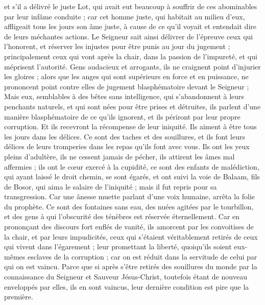\begin{multicols}{2}
et s'il a délivré le juste Lot, qui avait eut beaucoup à souffrir de ces abominables par leur infâme conduite ;
car cet homme juste, qui habitait au milieu d’eux, affligeait tous les jours son âme juste, à cause de ce qu’il voyait et entendait dire de leurs méchantes actions.
Le Seigneur sait ainsi délivrer de l’épreuve ceux qui l’honorent, et réserver les injustes pour être punis au jour du jugement ;
principalement ceux qui vont après la chair, dans la passion de l'impureté, et qui méprisent l’autorité. Gens audacieux et arrogants, ils ne craignent point d’injurier les gloires ;
alors que les anges qui sont supérieurs en force et en puissance, ne prononcent point contre elles de jugement blasphématoire devant le Seigneur ;
Mais eux, semblables à des bêtes sans intelligence, qui s’abandonnent à leurs penchants naturels, et qui sont nées pour être prises et détruites, ils parlent d’une manière blasphématoire de ce qu’ils ignorent, et ils périront par leur propre corruption.
Et ils recevront la récompense de leur iniquité. Ils aiment à être tous les jours dans les délices. Ce sont des taches et des souillures, et ils font leurs délices de leurs tromperies dans les repas qu'ils font avec vous.
Ils ont les yeux pleins d'adultère, ils ne cessent jamais de pécher, ils attirent les âmes mal affermies ; ils ont le cœur exercé à la cupidité, ce sont des enfants de malédiction,
qui ayant laissé le droit chemin, se sont égarés, et ont suivi la voie de Balaam, fils de Bosor, qui aima le salaire de l'iniquité ; mais il fut repris pour sa transgression.
Car une ânesse muette parlant d'une voix humaine, arrêta la folie du prophète.
Ce sont des fontaines sans eau, des nuées agitées par le tourbillon, et des gens à qui l'obscurité des ténèbres est réservée éternellement.
Car en prononçant des discours fort enflés de vanité, ils amorcent par les convoitises de la chair, et par leurs impudicités, ceux qui s'étaient véritablement retirés de ceux qui vivent dans l’égarement ;
leur promettant la liberté, quoiqu’ils soient eux-mêmes esclaves de la corruption ; car on est réduit dans la servitude de celui par qui on est vaincu.
Parce que si après s’être retirés des souillures du monde par la connaissance du Seigneur et Sauveur Jésus-Christ, toutefois étant de nouveau enveloppés par elles, ils en sont vaincus, leur dernière condition est pire que la première.

\end{multicols}
